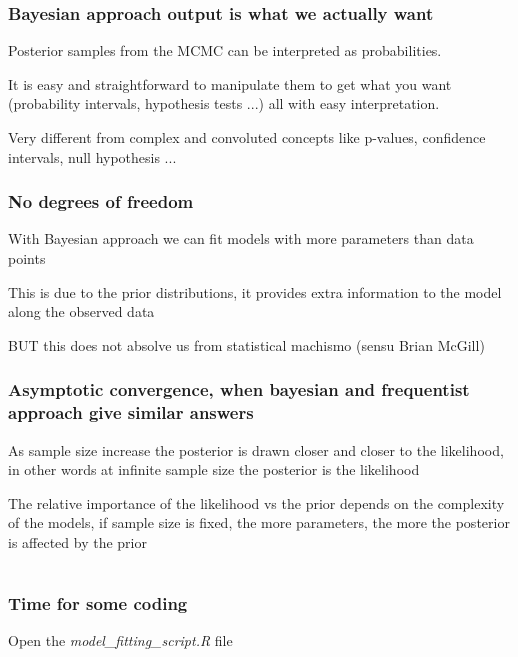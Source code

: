 \documentclass{beamer}
\begin{document}
 
  \begin{frame}
  \frametitle{\bf Bayesian approach output is what we actually want}
  
  Posterior samples from the MCMC can be interpreted as probabilities.\\
  
  \vspace*{0.3cm}
  
  It is easy and straightforward to manipulate them to get what you want (probability intervals, hypothesis tests ...) all with easy interpretation.\\
  
  \vspace*{0.3cm}
  
  Very different from complex and convoluted concepts like p-values, confidence intervals, null hypothesis ...
  
  
 \end{frame}
 
  \begin{frame}
  \frametitle{\bf No degrees of freedom}
  
  With Bayesian approach we can fit models with more parameters than data points
  
  \vspace*{0.3cm}
  
  This is due to the prior distributions, it provides extra information to the model along the observed data
  
  \vspace*{0.3cm}
  
  BUT this does not absolve us from statistical machismo (sensu Brian McGill)
  
 \end{frame}
 
  \begin{frame}
  \frametitle{\bf Asymptotic convergence, when bayesian and frequentist approach give similar answers}
  
  As sample size increase the posterior is drawn closer and closer to the likelihood, in other words at infinite sample size the posterior is the likelihood
  
  \vspace*{0.3cm}
  
  The relative importance of the likelihood vs the prior depends on the complexity of the models, if sample size is fixed, the more parameters, the more the posterior is affected by the prior
  
  
 \end{frame}
 
 \section*{}
 
 \begin{frame}
  \frametitle{\bf Time for some coding}
  
 \begin{center}
  Open the \textit{model\_fitting\_script.R} file
 \end{center}
 
\end{frame}
 
\end{document}
